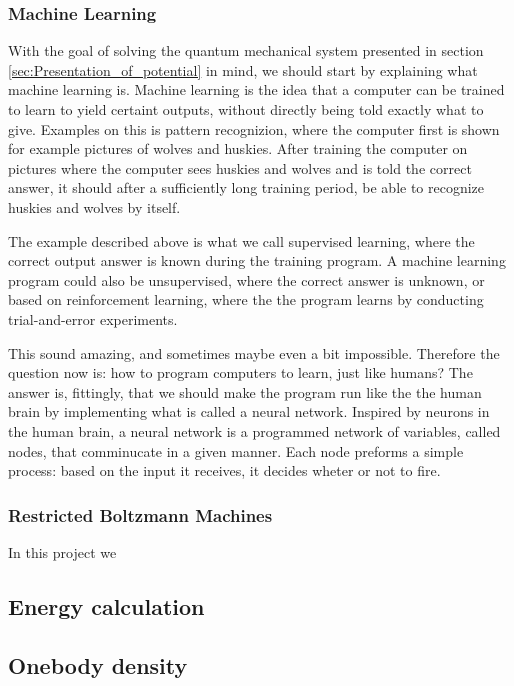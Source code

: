 \documentclass[norsk,a4paper,12pt]{article}
\begin{document}
\subsubsection{Machine Learning}
With the goal of solving the quantum mechanical system presented in section \ref{sec:Presentation_of_potential} in mind, we should start by explaining what machine learning is. Machine learning is the idea that a computer can be trained to learn to yield certaint outputs, without directly being told exactly what to give. Examples on this is pattern recognizion, where the computer first is shown for example pictures of wolves and huskies. After training the computer on pictures where the computer sees huskies and wolves and is told the correct answer, it should after a sufficiently long training period, be able to recognize huskies and wolves by itself. 
\par 
\vspace{3mm}
The example described above is what we call supervised learning, where the correct output answer is known during the training program. A machine learning program could also be unsupervised, where the correct answer is unknown, or based on reinforcement learning, where the the program learns by conducting trial-and-error experiments. 
\par 
\vspace{3mm}
 This sound amazing, and sometimes maybe even a bit impossible. Therefore the question now is: how to program computers to learn, just like humans? The answer is, fittingly, that we should make the program run like the the human brain by implementing what is called a neural network. Inspired by neurons in the human brain, a neural network is a programmed network of variables, called nodes, that comminucate in a given manner. Each node preforms a simple process: based on the input it receives, it decides wheter or not to fire. 

\subsubsection{Restricted Boltzmann Machines}
In this project we 


\subsection{Energy calculation}



\subsection{Onebody density}
\end{document}
